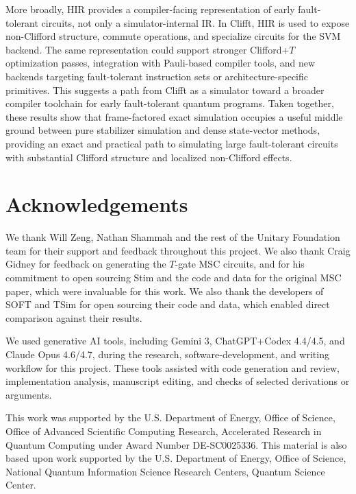 \documentclass[a4paper, onecolumn, unpublished]{quantumarticle}
\begin{document}
    More broadly, HIR provides a compiler-facing representation of early fault-tolerant circuits, not only a simulator-internal IR. In Clifft, HIR is used to expose non-Clifford structure, commute operations, and specialize circuits for the SVM backend. The same representation could support stronger Clifford+$T$ optimization passes, integration with Pauli-based compiler tools, and new backends targeting fault-tolerant instruction sets or architecture-specific primitives. This suggests a path from Clifft as a simulator toward a broader compiler toolchain for early fault-tolerant quantum programs. Taken together, these results show that frame-factored exact simulation occupies a useful middle ground between pure stabilizer simulation and dense state-vector methods, providing an exact and practical path to simulating large fault-tolerant circuits with substantial Clifford structure and localized non-Clifford effects.

    \section*{Acknowledgements}
    We thank Will Zeng, Nathan Shammah and the rest of the Unitary Foundation team for their support and feedback throughout this project. We also thank Craig Gidney for feedback on generating the $T$-gate MSC circuits, and for his commitment to open sourcing Stim and the code and data for the original MSC paper, which were invaluable for this work. We also thank the developers of SOFT and TSim for open sourcing their code and data, which enabled direct comparison against their results.

    We used generative AI tools, including Gemini 3, ChatGPT+Codex 4.4/4.5, and Claude Opus 4.6/4.7, during the research, software-development, and writing workflow for this project. These tools assisted with code generation and review, implementation analysis, manuscript editing, and checks of selected derivations or arguments.

    This work was supported by the U.S. Department of Energy, Office of Science, Office of Advanced Scientific Computing Research, Accelerated Research in Quantum Computing under Award Number DE-SC0025336. This material is also based upon work supported by the U.S. Department of Energy, Office of Science, National Quantum Information Science Research Centers, Quantum Science Center.

    
    

    \appendix
\end{document}
